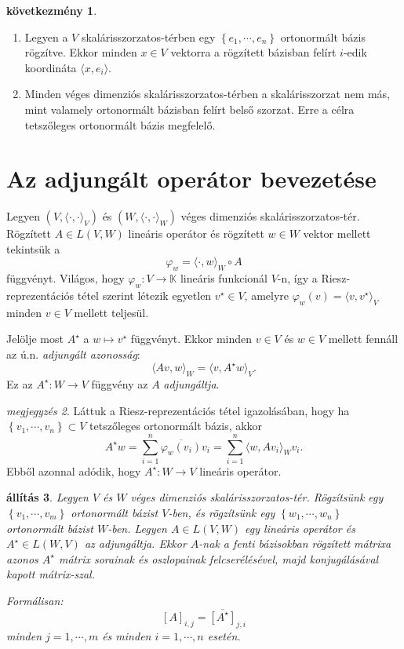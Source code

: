 \documentclass[9pt, a4paper, showtrims]{memoir}
\theoremstyle{plain}
\newtheorem{proposition}{állítás}[chapter]
\theoremstyle{remark}
\newtheorem{note}[proposition]{megjegyzés}
\theoremstyle{definition}
\newtheorem{corollary}[proposition]{következmény}
\newcommand{\ip}[2]{\langle#1,#2\rangle}
\begin{document}
\begin{corollary}
    \begin{enumerate}
        \item Legyen a $V$ skalárisszorzatos-térben egy 
            $\left\{ e_1,\cdots,e_n \right\}$ ortonormált bázis rögzítve.
            Ekkor minden $x\in V$ vektorra a rögzített bázisban felírt $i$-edik koordináta $\ip{x}{e_i}$.
        \item
            Minden véges dimenziós skalárisszorzatos-térben a skalárisszorzat nem más, 
            mint valamely ortonormált bázisban felírt belső szorzat.
            Erre a célra tetszőleges ortonormált bázis megfelelő.
    \end{enumerate}
\end{corollary}

\section{Az adjungált operátor bevezetése}
Legyen $\left( V,\ip{\cdot}{\cdot}_V \right)$ és
$\left( W,\ip{\cdot}{\cdot}_W \right)$ véges dimenziós skalárisszorzatos-tér.
Rögzített $A\in L\left( V,W \right)$ lineáris operátor és rögzített $w\in W$ vektor mellett tekintsük a 
\[
    \varphi_w=
    \ip{\cdot}{w}_W\circ A
\]
függvényt. 
Világos, hogy $\varphi_w:V\to\mathbb{K}$ lineáris funkcionál $V$-n, 
így a Riesz-reprezentációs tétel szerint létezik egyetlen $v^\star\in V$, 
amelyre
$\varphi_w\left( v \right)=\ip{v}{v^\star}_V$ minden $v\in V$ mellett teljesül.

Jelölje most $A^\star$ a $w\mapsto v^\star$ függvényt. 
Ekkor minden $v\in V$ és $w\in V$ mellett fennáll az ú.n. \emph{adjungált azonosság}:
\[
    \ip{Av}{w}_W=\ip{v}{A^\star w}_V.
\]
Ez az $A^\star:W\to V$ függvény az $A$ \emph{adjungáltja}.


\begin{note}
    Láttuk a Riesz-reprezentációs tétel igazolásában, hogy ha $\left\{ v_1,\cdots,v_n \right\}\subset V$
    tetszőleges ortonormált bázis, akkor 
    \[
        A^\star w=
        \sum_{i=1}^n\overline{\varphi_w\left( v_i \right)}v_i=
        \sum_{i=1}^n\ip{w}{Av_i}_Wv_i.
    \]
    Ebből azonnal adódik, hogy $A^\star:W\to V$ lineáris operátor.
\end{note}


\begin{proposition}
    Legyen $V$ és $W$ véges dimenziós skalárisszorzatos-tér.
    Rögzítsünk egy $\left\{ v_1,\cdots,v_m \right\}$ ortonormált bázist $V$-ben,
    és rögzítsünk egy $\left\{w_1,\cdots,w_n\right\}$ ortonormált bázist $W$-ben.
    Legyen $A\in L\left( V,W \right)$ egy lineáris operátor és $A^\star\in L\left( W,V \right)$ az adjungáltja.
    Ekkor $A$-nak a fenti bázisokban rögzített mátrixa azonos 
    $A^\star$ mátrix sorainak és oszlopainak felcserélésével, majd konjugálásával kapott mátrix-szal.

    Formálisan:
    \[
        \left[ A \right]_{i,j}=\overline{\left[ A^\star \right]}_{j,i}
    \]
    minden $j=1,\cdots,m$ és minden $i=1,\cdots,n$ esetén.
\end{proposition}
\end{document}

